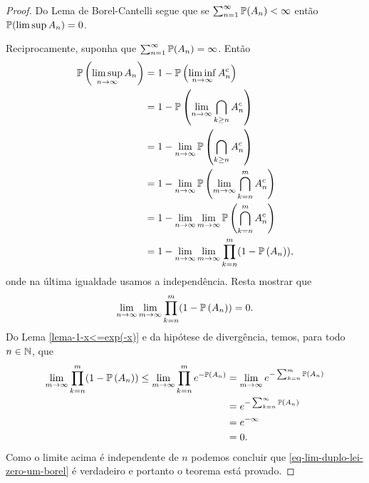 \begin{proof}
Do Lema de Borel-Cantelli
segue que se $\sum_{n=1}^{\infty} \P(A_n)<\infty$
então $\P (\limsup A_n )=0$. 




Reciprocamente, suponha que $\sum_{n=1}^{\infty} \P(A_n)=\infty$.
Então
%
%
%
\begin{align*}
\P\left(\limsup_{n\to\infty} A_n\right)
&=
1-\P\left(\liminf_{n\to\infty} A_n^c\right)
\\
&=
1-\P\left(\lim_{n\to\infty} \bigcap_{k\geq n} A_n^c\right)
\\
&=
1-\lim_{n\to\infty}\P\left( \bigcap_{k\geq n} A_n^c\right)
\\
&=
1-\lim_{n\to\infty}\P\left(\lim_{m\to\infty} \bigcap_{k=n}^m A_n^c\right)
\\
&=
1-\lim_{n\to\infty}\lim_{m\to\infty}\P\left( \bigcap_{k=n}^m A_n^c\right)
\\
&=
1-\lim_{n\to\infty}\lim_{m\to\infty}\prod_{k=n}^m (1-\P\left( A_n\right)),
\end{align*}
%
%
%
%
%
%
onde na última igualdade usamos a independência. 
Resta mostrar que 
	\begin{equation}\label{eq-lim-duplo-lei-zero-um-borel}
		\lim_{n\to\infty}\lim_{m\to\infty}\prod_{k=n}^m (1-\P\left( A_n\right))
		=
		0.
	\end{equation}
Do Lema \ref{lema-1-x<=exp(-x)} e da hipótese de divergência,
temos, para todo $n\in\N$, que
%
\begin{align*}
	\lim_{m\to\infty}\prod_{k=n}^m (1-\P\left( A_n\right))
	\leq
	\lim_{m\to\infty}\prod_{k=n}^m e^{-\P\left( A_n\right)}
	&=
	\lim_{m\to\infty}e^{-\sum_{k=n}^m\P\left( A_n\right)}
	\\
	&=
	e^{-\sum_{k=n}^{\infty}\P\left( A_n\right)}
	\\
	&=
	e^{-\infty}
	\\
	&=
	0.
\end{align*}
%
Como o limite acima é independente de $n$
podemos concluir que \eqref{eq-lim-duplo-lei-zero-um-borel}
é verdadeiro e portanto o teorema está provado. 




\end{proof}
